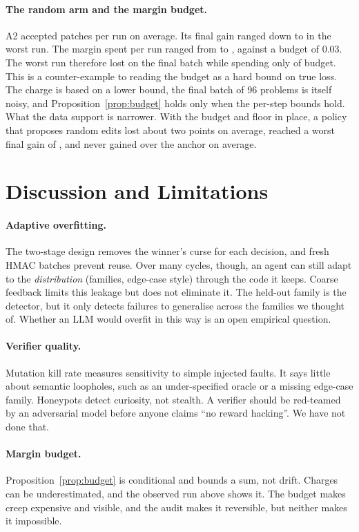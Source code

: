 \documentclass[11pt]{article}
\begin{document}
\paragraph{The random arm and the margin budget.} A2 accepted \AtwoAcc{} patches per run on average. Its final gain ranged down to \AtwoMin{} in the worst run. The margin spent per run ranged from \AtwoMinMargin{} to \AtwoMaxMargin{}, against a budget of $0.03$.
The worst run therefore lost \AtwoMin{} on the final batch while spending only \AtwoMinMargin{} of budget. This is a counter-example to reading the budget as a hard bound on true loss. The charge is based on a lower bound, the final batch of 96 problems is itself noisy, and Proposition~\ref{prop:budget} holds only when the per-step bounds hold.
What the data support is narrower. With the budget and floor in place, a policy that proposes random edits lost about two points on average, reached a worst final gain of \AtwoMin{}, and never gained over the anchor on average.

\section{Discussion and Limitations}
\label{sec:disc}

\paragraph{Adaptive overfitting.} The two-stage design removes the winner's curse for each decision, and fresh HMAC batches prevent reuse. Over many cycles, though, an agent can still adapt to the \emph{distribution} (families, edge-case style) through the code it keeps.
Coarse feedback limits this leakage but does not eliminate it. The held-out family is the detector, but it only detects failures to generalise across the families we thought of.
Whether an LLM would overfit in this way is an open empirical question.

\paragraph{Verifier quality.} Mutation kill rate measures sensitivity to simple injected faults. It says little about semantic loopholes, such as an under-specified oracle or a missing edge-case family. Honeypots detect curiosity, not stealth.
A verifier should be red-teamed by an adversarial model before anyone claims ``no reward hacking''. We have not done that.

\paragraph{Margin budget.} Proposition~\ref{prop:budget} is conditional and bounds a sum, not drift. Charges can be underestimated, and the observed run above shows it. The budget makes creep expensive and visible, and the audit makes it reversible, but neither makes it impossible.
\end{document}
